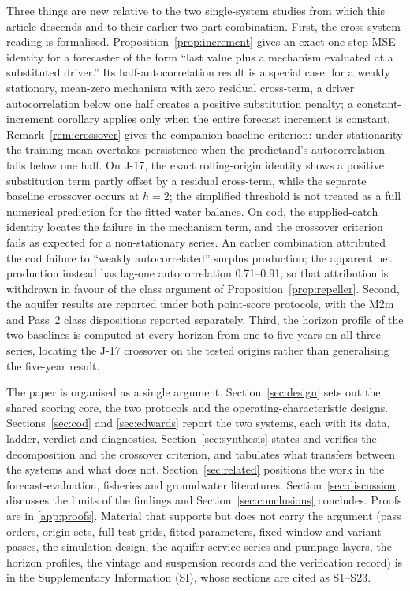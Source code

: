 \documentclass[preprint,11pt,authoryear]{elsarticle}
\theoremstyle{definition}
\theoremstyle{remark}
\begin{document}
Three things are new relative to the two single-system studies from which this article descends and to their earlier two-part combination. First, the cross-system reading is formalised. Proposition~\ref{prop:increment} gives an exact one-step MSE identity for a forecaster of the form ``last value plus a mechanism evaluated at a substituted driver.'' Its half-autocorrelation result is a special case: for a weakly stationary, mean-zero mechanism with zero residual cross-term, a driver autocorrelation below one half creates a positive substitution penalty; a constant-increment corollary applies only when the entire forecast increment is constant. Remark~\ref{rem:crossover} gives the companion baseline criterion: under stationarity the training mean overtakes persistence when the predictand's autocorrelation falls below one half. On J-17, the exact rolling-origin identity shows a positive substitution term partly offset by a residual cross-term, while the separate baseline crossover occurs at $h=2$; the simplified threshold is not treated as a full numerical prediction for the fitted water balance. On cod, the supplied-catch identity locates the failure in the mechanism term, and the crossover criterion fails as expected for a non-stationary series. An earlier combination attributed the cod failure to ``weakly autocorrelated'' surplus production; the apparent net production instead has lag-one autocorrelation 0.71--0.91, so that attribution is withdrawn in favour of the class argument of Proposition~\ref{prop:repeller}. Second, the aquifer results are reported under both point-score protocols, with the M2m and Pass~2 class dispositions reported separately. Third, the horizon profile of the two baselines is computed at every horizon from one to five years on all three series, locating the J-17 crossover on the tested origins rather than generalising the five-year result.

The paper is organised as a single argument. Section~\ref{sec:design} sets out the shared scoring core, the two protocols and the operating-characteristic designs. Sections~\ref{sec:cod} and \ref{sec:edwards} report the two systems, each with its data, ladder, verdict and diagnostics. Section~\ref{sec:synthesis} states and verifies the decomposition and the crossover criterion, and tabulates what transfers between the systems and what does not. Section~\ref{sec:related} positions the work in the forecast-evaluation, fisheries and groundwater literatures. Section~\ref{sec:discussion} discusses the limits of the findings and Section~\ref{sec:conclusions} concludes. Proofs are in \ref{app:proofs}. Material that supports but does not carry the argument (pass orders, origin sets, full test grids, fitted parameters, fixed-window and variant passes, the simulation design, the aquifer service-series and pumpage layers, the horizon profiles, the vintage and suspension records and the verification record) is in the Supplementary Information (SI), whose sections are cited as S1--S23.
\end{document}
